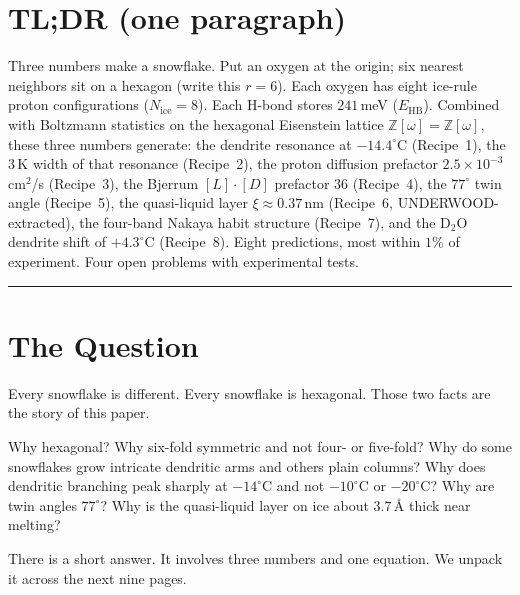 \documentclass[final]{siamltex}
\newcommand{\EHB}{E_{\text{HB}}}
\newcommand{\Nrule}{N_{\text{ice}}}
\newcommand{\Z}{\mathbb{Z}}
\newcommand{\Eisenstein}{\mathbb{Z}[\omega]}
\begin{document}
\pagestyle{myheadings}
\thispagestyle{plain}

\section*{TL;DR (one paragraph)}

Three numbers make a snowflake.  Put an oxygen at the origin; six
nearest neighbors sit on a hexagon (write this $r = 6$).  Each
oxygen has eight ice-rule proton configurations ($\Nrule = 8$).
Each H-bond stores $241$\,meV ($\EHB$).  Combined with Boltzmann
statistics on the hexagonal Eisenstein lattice $\Eisenstein =
\Z[\omega]$, these three numbers generate: the dendrite resonance
at $-14.4^{\circ}$C (Recipe~1), the $3$\,K width of that resonance
(Recipe~2), the proton diffusion prefactor $2.5\times
10^{-3}$\,cm$^2$/s (Recipe~3), the Bjerrum $[L]\!\cdot\![D]$
prefactor $36$ (Recipe~4), the $77^{\circ}$ twin angle (Recipe~5),
the quasi-liquid layer $\xi \approx 0.37$\,nm (Recipe~6,
UNDERWOOD-extracted), the four-band Nakaya habit structure
(Recipe~7), and the D$_2$O dendrite shift of $+4.3^{\circ}$C
(Recipe~8).  Eight predictions, most within $1\%$ of experiment.
Four open problems with experimental tests.

\bigskip
\hrule
\bigskip

\section{The Question}

Every snowflake is different.  Every snowflake is hexagonal.
Those two facts are the story of this paper.

Why hexagonal?  Why six-fold symmetric and not four- or five-fold?
Why do some snowflakes grow intricate dendritic arms and others
plain columns?  Why does dendritic branching peak sharply at
$-14^{\circ}$C and not $-10^{\circ}$C or $-20^{\circ}$C?  Why are
twin angles $77^{\circ}$?  Why is the quasi-liquid layer on ice
about $3.7$\,{\AA} thick near melting?

There is a short answer.  It involves three numbers and one
equation.  We unpack it across the next nine pages.
\end{document}
